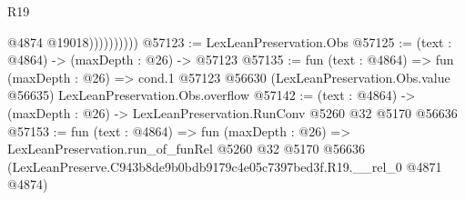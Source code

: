 \begin{lexlean}{R19}
\begin{coremodule}
                        @4874
                        @19018))))))))))
@57123 := LexLeanPreservation.Obs
@57125 := (text : @4864) -> (maxDepth : @26) -> @57123
@57135 := fun (text : @4864) =>
  fun (maxDepth : @26) =>
  cond.{1} @57123 @56630 (LexLeanPreservation.Obs.value @56635) LexLeanPreservation.Obs.overflow
@57142 := (text : @4864) -> (maxDepth : @26) -> LexLeanPreservation.RunConv @5260 @32 @5170 @56636
@57153 := fun (text : @4864) =>
  fun (maxDepth : @26) =>
  LexLeanPreservation.run_of_funRel
    @5260
    @32
    @5170
    @56636
    (LexLeanPreserve.C943b8de9b0bdb9179c4e05c7397bed3f.R19.__rel_0 @4871 @4874)
\end{coremodule}
\end{lexlean}
